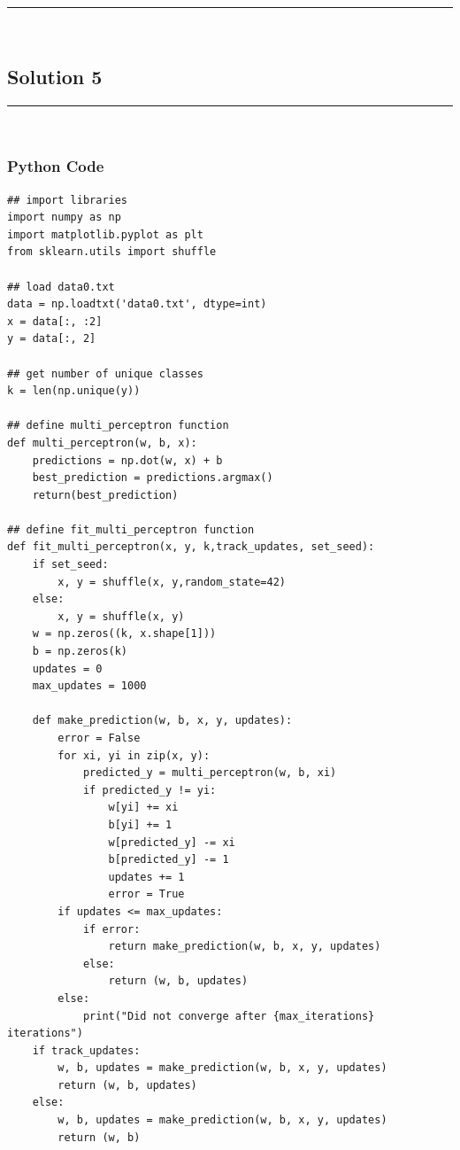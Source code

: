 \documentclass{article}
\begin{document}
\noindent\rule{\textwidth}{0.4pt}\\

\newpage

\subsection*{Solution 5}
\noindent\rule{\textwidth}{0.4pt}\\


\subsubsection*{Python Code}

\begin{lstlisting}
## import libraries
import numpy as np
import matplotlib.pyplot as plt
from sklearn.utils import shuffle

## load data0.txt
data = np.loadtxt('data0.txt', dtype=int)
x = data[:, :2]
y = data[:, 2]

## get number of unique classes
k = len(np.unique(y))

## define multi_perceptron function
def multi_perceptron(w, b, x):
    predictions = np.dot(w, x) + b
    best_prediction = predictions.argmax()
    return(best_prediction)
    
## define fit_multi_perceptron function
def fit_multi_perceptron(x, y, k,track_updates, set_seed):
    if set_seed:
        x, y = shuffle(x, y,random_state=42)
    else:
        x, y = shuffle(x, y)
    w = np.zeros((k, x.shape[1]))
    b = np.zeros(k)
    updates = 0
    max_updates = 1000

    def make_prediction(w, b, x, y, updates):
        error = False    
        for xi, yi in zip(x, y):
            predicted_y = multi_perceptron(w, b, xi) 
            if predicted_y != yi:
                w[yi] += xi
                b[yi] += 1
                w[predicted_y] -= xi
                b[predicted_y] -= 1
                updates += 1
                error = True  
        if updates <= max_updates:
            if error:
                return make_prediction(w, b, x, y, updates) 
            else:
                return (w, b, updates)
        else:
            print("Did not converge after {max_iterations} iterations")
    if track_updates:
        w, b, updates = make_prediction(w, b, x, y, updates)
        return (w, b, updates)
    else:
        w, b, updates = make_prediction(w, b, x, y, updates)
        return (w, b)
\end{lstlisting}
\end{document}
